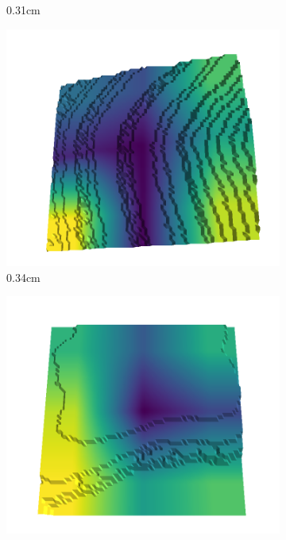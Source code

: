 \documentclass[../document.tex]{subfiles}
\begin{document}
\begin{figure}[H]
\begin{subfigure}[b]{0.242\linewidth}
    \caption{0.31cm}
    \end{subfigure}
    \begin{subfigure}[b]{0.242\linewidth}
    \includegraphics[width=\linewidth]{../img/5/quarry/best/47-patch-3d-majavi-colormap-30.png}
    \caption{0.34cm}
    \end{subfigure}
    \begin{subfigure}[b]{0.242\linewidth}
    \includegraphics[width=\linewidth]{../img/5/quarry/best/49-patch-3d-majavi-colormap-35.png}

\end{subfigure}
\end{figure}
\end{document}
